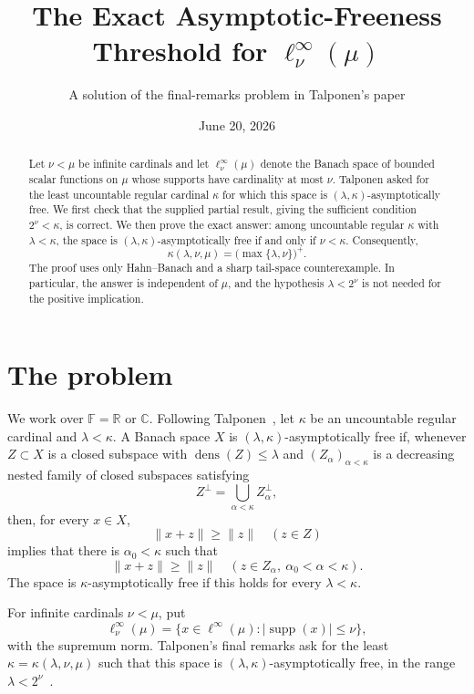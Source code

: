 \documentclass[11pt]{article}
\title{The Exact Asymptotic-Freeness Threshold for \(\ell_\nu^\infty(\mu)\)}
\author{A solution of the final-remarks problem in Talponen's paper}
\date{June 20, 2026}
\theoremstyle{remark}
\newcommand{\F}{\mathbb F}
\newcommand{\dens}{\operatorname{dens}}
\newcommand{\supp}{\operatorname{supp}}
\begin{document}
\maketitle

\begin{abstract}
Let \(\nu<\mu\) be infinite cardinals and let
\(\ell_\nu^\infty(\mu)\) denote the Banach space of bounded scalar
functions on \(\mu\) whose supports have cardinality at most \(\nu\).
Talponen asked for the least uncountable regular cardinal \(\kappa\) for
which this space is \((\lambda,\kappa)\)-asymptotically free.  We first
check that the supplied partial result, giving the sufficient condition
\(2^\nu<\kappa\), is correct.  We then prove the exact answer: among
uncountable regular \(\kappa\) with \(\lambda<\kappa\), the space is
\((\lambda,\kappa)\)-asymptotically free if and only if \(\nu<\kappa\).
Consequently,
\[
  \kappa(\lambda,\nu,\mu)=\bigl(\max\{\lambda,\nu\}\bigr)^+.
\]
The proof uses only Hahn--Banach and a sharp tail-space counterexample.
In particular, the answer is independent of \(\mu\), and the hypothesis
\(\lambda<2^\nu\) is not needed for the positive implication.
\end{abstract}

\section{The problem}

We work over \(\F=\mathbb R\) or \(\mathbb C\).  Following
Talponen~\cite{Talponen}, let \(\kappa\) be an uncountable regular cardinal
and \(\lambda<\kappa\).  A Banach space \(X\) is
\((\lambda,\kappa)\)-asymptotically free if, whenever
\(Z\subset X\) is a closed subspace with \(\dens(Z)\leq\lambda\) and
\((Z_\alpha)_{\alpha<\kappa}\) is a decreasing nested family of closed
subspaces satisfying
\[
  Z^\perp=\bigcup_{\alpha<\kappa} Z_\alpha^\perp,
\]
then, for every \(x\in X\),
\[
  \|x+z\|\geq \|z\|\quad(z\in Z)
\]
implies that there is \(\alpha_0<\kappa\) such that
\[
  \|x+z\|\geq \|z\|\quad
  (z\in Z_\alpha,\ \alpha_0<\alpha<\kappa).
\]
The space is \(\kappa\)-asymptotically free if this holds for every
\(\lambda<\kappa\).

For infinite cardinals \(\nu<\mu\), put
\[
 \ell_\nu^\infty(\mu)
 =\{x\in\ell^\infty(\mu):|\supp(x)|\leq\nu\},
\]
with the supremum norm.  Talponen's final remarks ask for the least
\(\kappa=\kappa(\lambda,\nu,\mu)\) such that this space is
\((\lambda,\kappa)\)-asymptotically free, in the range
\(\lambda<2^\nu\)~\cite[Section~6]{Talponen}.
\end{document}
